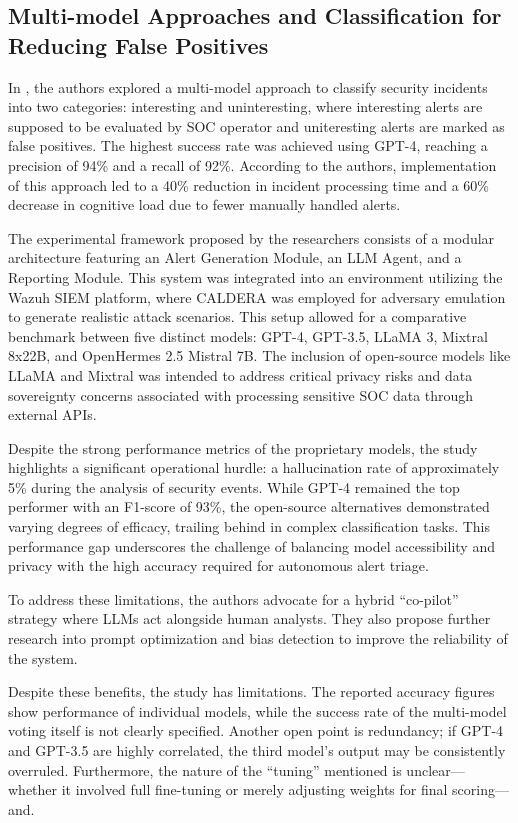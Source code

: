 \documentclass[conference]{IEEEtran}
\begin{document}
\subsection{Multi-model Approaches and Classification for Reducing False Positives}\label{sec:siem_start}
In \cite{b2}, the authors explored a multi-model approach to classify security incidents into two categories: 
interesting and uninteresting, where interesting alerts are supposed to be evaluated by SOC operator and uniteresting alerts are marked as false positives.
The highest success rate was achieved using GPT-4, reaching a precision of 94\% and a recall of 92\%. 
According to the authors, implementation of this approach led to a 40\% reduction in incident processing time 
and a 60\% decrease in cognitive load due to fewer manually handled alerts.

The experimental framework proposed by the researchers consists of a modular architecture featuring an Alert Generation Module, 
an LLM Agent, and a Reporting Module. This system was integrated into an environment utilizing the Wazuh SIEM platform, 
where CALDERA was employed for adversary emulation to generate realistic attack scenarios. 
This setup allowed for a comparative benchmark between five distinct models: GPT-4, GPT-3.5, LLaMA 3, Mixtral 8x22B, and OpenHermes 2.5 Mistral 7B. 
The inclusion of open-source models like LLaMA and Mixtral was intended to address critical privacy risks and data sovereignty concerns associated with processing sensitive SOC data through external APIs.

Despite the strong performance metrics of the proprietary models, the study highlights a significant operational hurdle: 
a hallucination rate of approximately 5\% during the analysis of security events.
While GPT-4 remained the top performer with an F1-score of 93\%, the open-source alternatives demonstrated varying degrees of efficacy, trailing behind in complex classification tasks. 
This performance gap underscores the challenge of balancing model accessibility and privacy with the high accuracy required for autonomous alert triage.

To address these limitations, the authors advocate for a hybrid ``co-pilot'' strategy where LLMs act alongside human analysts. 
They also propose further research into prompt optimization and bias detection to improve the reliability of the system. 

Despite these benefits, the study has limitations. The reported accuracy figures show performance of individual models, 
while the success rate of the multi-model voting itself is not clearly specified. 
Another open point is redundancy; if GPT-4 and GPT-3.5 are highly correlated, the third model’s output may be consistently overruled. 
Furthermore, the nature of the ``tuning'' mentioned is unclear—whether it involved full fine-tuning or merely adjusting weights for final scoring—and.
\end{document}
